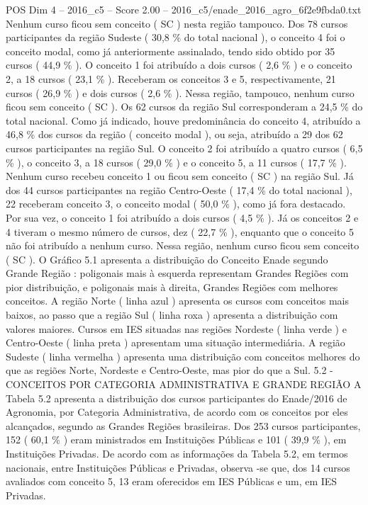 \begin{textsample}{POS Dim 4 – 2016\_c5 – Score 2.00 – 2016\_c5/enade\_2016\_agro\_6f2e9fbda0.txt}
Nenhum curso ficou sem conceito ( SC ) nesta região tampouco.
Dos 78 cursos participantes da região Sudeste ( 30,8 \% do total nacional ), o conceito 4 foi o conceito modal, como já anteriormente assinalado, tendo sido obtido por 35 cursos ( 44,9 \% ).
O conceito 1 foi atribuído a dois cursos ( 2,6 \% ) e o conceito 2, a 18 cursos ( 23,1 \% ).
Receberam os conceitos 3 e 5, respectivamente, 21 cursos ( 26,9 \% ) e dois cursos ( 2,6 \% ).
Nessa região, tampouco, nenhum curso ficou sem conceito ( SC ).
Os 62 cursos da região Sul corresponderam a 24,5 \% do total nacional.
Como já indicado, houve predominância do conceito 4, atribuído a 46,8 \% dos cursos da região ( conceito modal ), ou seja, atribuído a 29 dos 62 cursos participantes na região Sul.
O conceito 2 foi atribuído a quatro cursos ( 6,5 \% ), o conceito 3, a 18 cursos ( 29,0 \% ) e o conceito 5, a 11 cursos ( 17,7 \% ).
Nenhum curso recebeu conceito 1 ou ficou sem conceito ( SC ) na região Sul.
Já dos 44 cursos participantes na região Centro-Oeste ( 17,4 \% do total nacional ), 22 receberam conceito 3, o conceito modal ( 50,0 \% ), como já fora destacado.
Por sua vez, o conceito 1 foi atribuído a dois cursos ( 4,5 \% ).
Já os conceitos 2 e 4 tiveram o mesmo número de cursos, dez ( 22,7 \% ), enquanto que o conceito 5 não foi atribuído a nenhum curso.
Nessa região, nenhum curso ficou sem conceito ( SC ).
O Gráfico 5.1 apresenta a distribuição do Conceito Enade segundo Grande Região : poligonais mais à esquerda representam Grandes Regiões com pior distribuição, e poligonais mais à direita, Grandes Regiões com melhores conceitos.
A região Norte ( linha azul ) apresenta os cursos com conceitos mais baixos, ao passo que a região Sul ( linha roxa ) apresenta a distribuição com valores maiores.
Cursos em IES situadas nas regiões Nordeste ( linha verde ) e Centro-Oeste ( linha preta ) apresentam uma situação intermediária.
A região Sudeste ( linha vermelha ) apresenta uma distribuição com conceitos melhores do que as regiões Norte, Nordeste e Centro-Oeste, mas pior do que a Sul. 5.2 - CONCEITOS POR CATEGORIA ADMINISTRATIVA E GRANDE REGIÃO A Tabela 5.2 apresenta a distribuição dos cursos participantes do Enade/2016 de Agronomia, por Categoria Administrativa, de acordo com os conceitos por eles alcançados, segundo as Grandes Regiões brasileiras.
Dos 253 cursos participantes, 152 ( 60,1 \% ) eram ministrados em Instituições Públicas e 101 ( 39,9 \% ), em Instituições Privadas.
De acordo com as informações da Tabela 5.2, em termos nacionais, entre Instituições Públicas e Privadas, observa -se que, dos 14 cursos avaliados com conceito 5, 13 eram oferecidos em IES Públicas e um, em IES Privadas.

\end{textsample}

